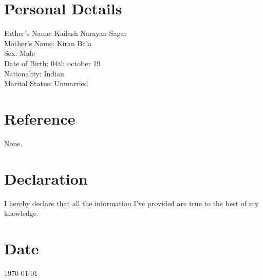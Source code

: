 \documentclass[margin,line]{res}
\begin{document}
\begin{resume}
		\section{\sc \bf Personal Details}
		Father's Name: Kailash Narayan Sagar\\
		Mother's Name: Kiran Bala\\
		Sex: Male\\
		Date of Birth: 04th october 19\\
		Nationality: Indian\\
		Marital Status: Unmarried\\
		
		\section{\sc \bf Reference}
		None.
		
		\section{\sc \bf Declaration}
		I hereby declare that all the information I’ve provided are true to the best of my knowledge.
		
		\section{\sc \bf Date}		
		\today
	\end{resume}
\end{document}
